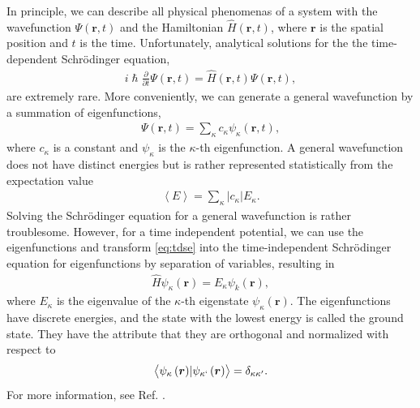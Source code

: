 In principle, we can describe all physical phenomenas of a system with the wavefunction $\Psi(\boldsymbol{r},t)$ and the Hamiltonian $\hat{H}(\boldsymbol{r},t)$, where $\boldsymbol{r}$ is the spatial position and $t$ is the time. Unfortunately, analytical solutions for the the time-dependent Schrödinger equation,
\begin{align}
    i\hslash \frac{\partial}{\partial t} \Psi(\boldsymbol{r},t) = \hat{H}(\boldsymbol{r},t) \Psi(\boldsymbol{r},t),
    \label{eq:tdse}
\end{align}
are extremely rare. More conveniently, we can generate a general wavefunction by a summation of eigenfunctions,
\begin{align}
  \Psi(\boldsymbol{r},t) = \sum_\kappa c_\kappa \psi_\kappa(\boldsymbol{r},t),
\end{align}
where $c_\kappa$ is a constant and $\psi_\kappa$ is the $\kappa$-th eigenfunction. A general wavefunction does not have distinct energies but is rather represented statistically from the expectation value  %
\begin{align}
  \left \langle E \right \rangle = \sum_\kappa \lvert c_\kappa \rvert E_\kappa.
\end{align} Solving the Schrödinger equation for a general wavefunction is rather troublesome. However, for a time independent potential, we can use the eigenfunctions and transform \autoref{eq:tdse} into the time-independent Schrödinger equation for eigenfunctions by separation of variables, resulting in
\begin{align}
  \hat{H}\psi_\kappa(\boldsymbol{r}) = E_\kappa \psi_k(\boldsymbol{r}),
\end{align}
where $E_\kappa$ is the eigenvalue of the $\kappa$-th eigenstate $\psi_\kappa(\boldsymbol{r})$. The eigenfunctions have discrete energies, and the state with the lowest energy is called the ground state. They have the attribute that they are orthogonal and normalized with respect to
\begin{align}
  \left \langle \psi_\kappa \left(\boldsymbol{r}\right) \rvert \psi_{\kappa`} \left(\boldsymbol{r} \right) \right \rangle = \delta_{\kappa \kappa'}.
\end{align}
For more information, see Ref. \cite{Griffiths2017}.

